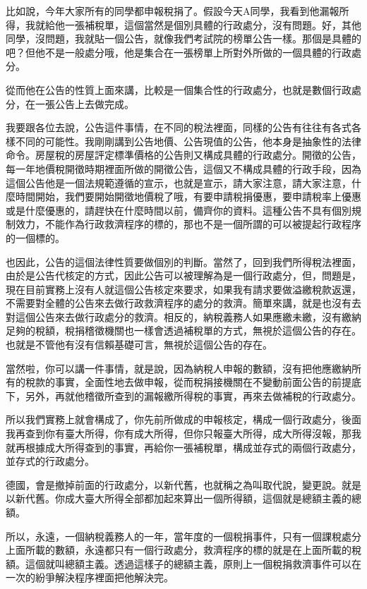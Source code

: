 \documentclass[oneside,sub3section]{ctexbook}
\begin{document}
比如說，今年大家所有的同學都申報稅捐了。假設今天A同學，我看到他漏報所得，我就給他一張補稅單，這個當然是個別具體的行政處分，沒有問題。好，其他同學，沒問題，我就貼一個公告，就像我們考試院的榜單公告一樣。那個是具體的吧？但他不是一般處分哦，他是集合在一張榜單上所對外所做的一個具體的行政處分。

從而他在公告的性質上面來講，比較是一個集合性的行政處分，也就是數個行政處分，在一張公告上去做完成。

我要跟各位去說，公告這件事情，在不同的稅法裡面，同樣的公告有往往有各式各樣不同的可能性。我剛剛講到公告地價、公告現值的公告，他本身是抽象性的法律命令。房屋稅的房屋評定標準價格的公告則又構成具體的行政處分。開徵的公告，每一年地價稅開徵時期裡面所做的開徵公告，這個又不構成具體的行政手段，因為這個公告他是一個法規範遵循的宣示，也就是宣示，請大家注意，請大家注意，什麼時間開始，我們要開始開徵地價稅了哦，有要申請稅捐優惠，要申請稅率上優惠或是什麼優惠的，請趕快在什麼時間以前，備齊你的資料。這種公告不具有個別規制效力，不能作為行政救濟程序的標的，那也不是一個所謂的可以被提起行政程序的一個標的。

也因此，公告的這個法律性質要做個別的判斷。當然了，回到我們所得稅法裡面，由於是公告代核定的方式，因此公告可以被理解為是一個行政處分，但，問題是，現在目前實務上沒有人就這個公告核定來要求，如果我有請求要做溢繳稅款返還，不需要對全體的公告來去做行政救濟程序的處分的救濟。簡單來講，就是也沒有去對這個公告來去做行政處分的救濟。相反的，納稅義務人如果應繳未繳，沒有繳納足夠的稅額，稅捐稽徵機關也一樣會透過補稅單的方式，無視於這個公告的存在。也就是不管他有沒有信賴基礎可言，無視於這個公告的存在。

當然啦，你可以講一件事情，就是說，因為納稅人申報的數額，沒有把他應繳納所有的稅款的事實，全面性地去做申報，從而稅捐接機關在不變動前面公告的前提底下，另外，再就他稽徵所查到的漏報繳所得稅的事實，再來去做補稅的行政處分。

所以我們實務上就會構成了，你先前所做成的申報核定，構成一個行政處分，後面我再查到你有臺大所得，你有成大所得，但你只報臺大所得，成大所得沒報，那我就再根據成大所得查到的事實，再給你一張補稅單，構成並存式的兩個行政處分，並存式的行政處分。

德國，會是撤掉前面的行政處分，以新代舊，也就稱之為叫取代說，變更說。就是以新代舊。你成大臺大所得全部都加起來算出一個所得額，這個就是總額主義的總額。

所以，永遠，一個納稅義務人的一年，當年度的一個稅捐事件，只有一個課稅處分上面所載的數額，永遠都只有一個行政處分，救濟程序的標的就是在上面所載的稅額。這個就叫總額主義。透過這樣子的總額主義，原則上一個稅捐救濟事件可以在一次的紛爭解決程序裡面把他解決完。
\end{document}
